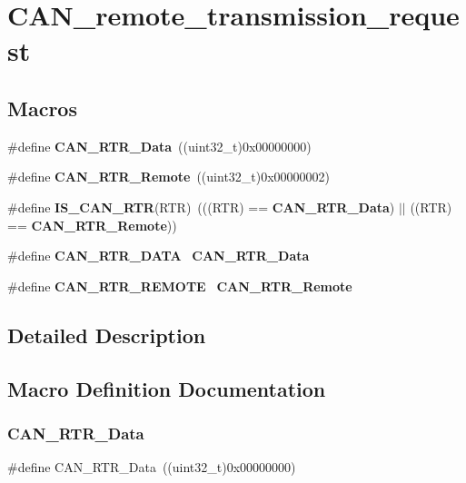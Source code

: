 \section{C\+A\+N\+\_\+remote\+\_\+transmission\+\_\+request}
\label{group__CAN__remote__transmission__request}
\subsection*{Macros}
\begin{DoxyCompactItemize}
\item 
\#define \textbf{ C\+A\+N\+\_\+\+R\+T\+R\+\_\+\+Data}~((uint32\+\_\+t)0x00000000)
\item 
\#define \textbf{ C\+A\+N\+\_\+\+R\+T\+R\+\_\+\+Remote}~((uint32\+\_\+t)0x00000002)
\item 
\#define \textbf{ I\+S\+\_\+\+C\+A\+N\+\_\+\+R\+TR}(R\+TR)~(((R\+TR) == \textbf{ C\+A\+N\+\_\+\+R\+T\+R\+\_\+\+Data}) $\vert$$\vert$ ((R\+TR) == \textbf{ C\+A\+N\+\_\+\+R\+T\+R\+\_\+\+Remote}))
\item 
\#define \textbf{ C\+A\+N\+\_\+\+R\+T\+R\+\_\+\+D\+A\+TA}~\textbf{ C\+A\+N\+\_\+\+R\+T\+R\+\_\+\+Data}
\item 
\#define \textbf{ C\+A\+N\+\_\+\+R\+T\+R\+\_\+\+R\+E\+M\+O\+TE}~\textbf{ C\+A\+N\+\_\+\+R\+T\+R\+\_\+\+Remote}
\end{DoxyCompactItemize}


\subsection{Detailed Description}


\subsection{Macro Definition Documentation}
\mbox{\label{group__CAN__remote__transmission__request_ga2407c3a8b2cd97bd651143aa959219f1}} 
\subsubsection{C\+A\+N\+\_\+\+R\+T\+R\+\_\+\+Data}
{\footnotesize\ttfamily \#define C\+A\+N\+\_\+\+R\+T\+R\+\_\+\+Data~((uint32\+\_\+t)0x00000000)}

